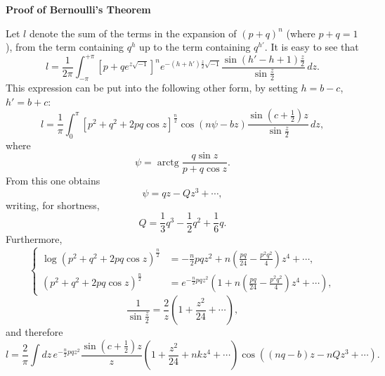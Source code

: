 \documentclass[11pt]{article}
\newcommand{\arctg}{\operatorname{arctg}}
\begin{document}
\begin{center}
{\Large\bfseries Proof of Bernoulli's Theorem\par}
\vspace{0.8em}
\end{center}

Let $l$ denote the sum of the terms in the expansion of $(p+q)^n$ (where $p+q=1$), from the term containing $q^h$ up to the term containing $q^{h'}$. It is easy to see that
\begin{equation}
 l=\frac{1}{2\pi}\int_{-\pi}^{+\pi}[p+q e^{z\sqrt{-1}}]^n e^{-(h+h')\frac z2\sqrt{-1}}\frac{\sin (h'-h+1)\frac z2}{\sin\frac z2}\,dz .
\tag{1}
\end{equation}
This expression can be put into the following other form, by setting $h=b-c$, $h'=b+c$:
\begin{equation}
 l=\frac1\pi\int_0^\pi [p^2+q^2+2pq\cos z]^{\frac n2}\cos(n\psi-bz)\frac{\sin(c+\frac12)z}{\sin\frac z2}\,dz,
\tag{2}
\end{equation}
where
\[
 \psi=\arctg\frac{q\sin z}{p+q\cos z}.
\]
From this one obtains
\begin{equation}
 \psi=qz-Qz^3+\cdots,
\tag{3}
\end{equation}
writing, for shortness,
\[
 Q=\frac13q^3-\frac12q^2+\frac16q.
\]
Furthermore,
\begin{equation}
\left\{\begin{aligned}
\log(p^2+q^2+2pq\cos z)^{\frac n2}
 &= -\frac n2pqz^2+n\left(\frac{pq}{24}-\frac{p^2q^2}{4}\right)z^4+\cdots,\\
(p^2+q^2+2pq\cos z)^{\frac n2}
 &= e^{-\frac n2pqz^2}\left(1+n\left(\frac{pq}{24}-\frac{p^2q^2}{4}\right)z^4+\cdots\right),
\end{aligned}\right.
\tag{4}
\end{equation}
\begin{equation}
 \frac1{\sin\frac z2}=\frac2z\left(1+\frac{z^2}{24}+\cdots\right),
\tag{5}
\end{equation}
and therefore
\begin{equation}
 l=\frac2\pi\int dz\,e^{-\frac n2pqz^2}\frac{\sin(c+\frac12)z}{z}\left(1+\frac{z^2}{24}+nkz^4+\cdots\right)\cos((nq-b)z-nQz^3+\cdots).
\tag{6}
\end{equation}
\end{document}
